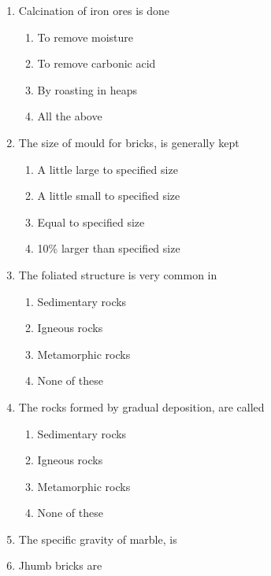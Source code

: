 \documentclass[11pt,a4paper]{article}
\begin{document}
\begin{enumerate}
\item{Calcination of iron ores is done}
\begin{enumerate}[label=\Alph*.]
\item{To remove moisture}
\item{To remove carbonic acid}
\item{By roasting in heaps}
\item{All the above}
\end{enumerate}
\item{The size of mould for bricks, is generally kept}
\begin{enumerate}[label=\Alph*.]
\item{A little large to specified size}
\item{A little small to specified size}
\item{Equal to specified size}
\item{10\% larger than specified size}
\end{enumerate}
\item{The foliated structure is very common in}
\begin{enumerate}[label=\Alph*.]
\item{Sedimentary rocks}
\item{Igneous rocks}
\item{Metamorphic rocks}
\item{None of these}
\end{enumerate}
\item{The rocks formed by gradual deposition, are called}
\begin{enumerate}[label=\Alph*.]
\item{Sedimentary rocks}
\item{Igneous rocks}
\item{Metamorphic rocks}
\item{None of these}
\end{enumerate}
\item{The specific gravity of marble, is}
\\
\item{Jhumb bricks are}
\\\begin{enumerate*}[itemjoin=\qquad, label=\Alph*.]

\end{enumerate*}
\end{enumerate}
\end{document}
